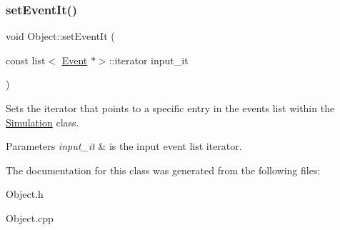\subsubsection{\texorpdfstring{set\+Event\+It()}{setEventIt()}}
{\footnotesize\ttfamily void Object\+::set\+Event\+It (\begin{DoxyParamCaption}\item[{const list$<$ \hyperlink{class_event}{Event} $\ast$$>$\+::iterator}]{input\+\_\+it }\end{DoxyParamCaption})}

Sets the iterator that points to a specific entry in the events list within the \hyperlink{class_simulation}{Simulation} class. 
\begin{DoxyParams}{Parameters}
{\em input\+\_\+it} & is the input event list iterator. \\
\hline
\end{DoxyParams}


The documentation for this class was generated from the following files\+:\begin{DoxyCompactItemize}
\item 
Object.\+h\item 
Object.\+cpp\end{DoxyCompactItemize}
